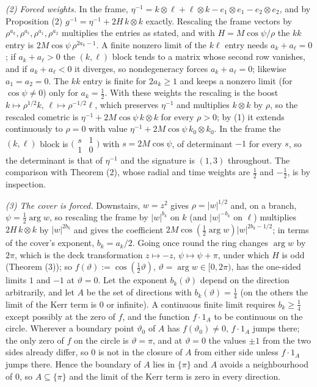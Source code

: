 \emph{(2) Forced weights.} In the frame, $\eta^{-1} = k\otimes\ell + \ell\otimes k - e_1\otimes e_1 - e_2\otimes e_2$, and by Proposition (2) $g^{-1} = \eta^{-1} + 2H\,k\otimes k$ exactly. Rescaling the frame vectors by $\rho^{a_k}, \rho^{a_\ell}, \rho^{a_1}, \rho^{a_2}$ multiplies the entries as stated, and with $H = M\cos\psi/\rho$ the $kk$ entry is $2M\cos\psi\,\rho^{2a_k - 1}$. A finite nonzero limit of the $k\ell$ entry needs $a_k + a_\ell = 0$; if $a_k + a_\ell > 0$ the $(k,\ell)$ block tends to a matrix whose second row vanishes, and if $a_k + a_\ell < 0$ it diverges, so nondegeneracy forces $a_k + a_\ell = 0$; likewise $a_1 = a_2 = 0$. The $kk$ entry is finite for $2a_k \ge 1$ and keeps a nonzero limit (for $\cos\psi \neq 0$) only for $a_k = \tfrac12$. With these weights the rescaling is the boost $k \mapsto \rho^{1/2}k$, $\ell \mapsto \rho^{-1/2}\ell$, which preserves $\eta^{-1}$ and multiplies $k\otimes k$ by $\rho$, so the rescaled cometric is $\eta^{-1} + 2M\cos\psi\,k\otimes k$ for every $\rho > 0$; by (1) it extends continuously to $\rho = 0$ with value $\eta^{-1} + 2M\cos\psi\,k_0\otimes k_0$. In the frame the $(k,\ell)$ block is $\bigl(\begin{smallmatrix} s & 1 \\ 1 & 0\end{smallmatrix}\bigr)$ with $s = 2M\cos\psi$, of determinant $-1$ for every $s$, so the determinant is that of $\eta^{-1}$ and the signature is $(1,3)$ throughout. The comparison with Theorem (2), whose radial and time weights are $\tfrac12$ and $-\tfrac12$, is by inspection.

\emph{(3) The cover is forced.} Downstairs, $w = z^2$ gives $\rho = |w|^{1/2}$ and, on a branch, $\psi = \tfrac12\arg w$, so rescaling the frame by $|w|^{b_k}$ on $k$ (and $|w|^{-b_k}$ on $\ell$) multiplies $2H\,k\otimes k$ by $|w|^{2b_k}$ and gives the coefficient $2M\cos(\tfrac12\arg w)|w|^{2b_k - 1/2}$; in terms of the cover's exponent, $b_k = a_k/2$. Going once round the ring changes $\arg w$ by $2\pi$, which is the deck transformation $z \mapsto -z$, $\psi \mapsto \psi + \pi$, under which $H$ is odd (Theorem (3)); so $f(\vartheta) := \cos(\tfrac12\vartheta)$, $\vartheta = \arg w \in [0, 2\pi)$, has the one-sided limits $1$ and $-1$ at $\vartheta = 0$. Let the exponent $b_k(\vartheta)$ depend on the direction arbitrarily, and let $A$ be the set of directions with $b_k(\vartheta) = \tfrac14$ (on the others the limit of the Kerr term is $0$ or infinite). A continuous finite limit requires $b_k \geq \tfrac14$ except possibly at the zero of $f$, and the function $f\cdot 1_A$ to be continuous on the circle. Wherever a boundary point $\vartheta_0$ of $A$ has $f(\vartheta_0) \neq 0$, $f\cdot1_A$ jumps there; the only zero of $f$ on the circle is $\vartheta = \pi$, and at $\vartheta = 0$ the values $\pm 1$ from the two sides already differ, so $0$ is not in the closure of $A$ from either side unless $f\cdot1_A$ jumps there. Hence the boundary of $A$ lies in $\{\pi\}$ and $A$ avoids a neighbourhood of $0$, so $A \subseteq \{\pi\}$ and the limit of the Kerr term is zero in every direction.

